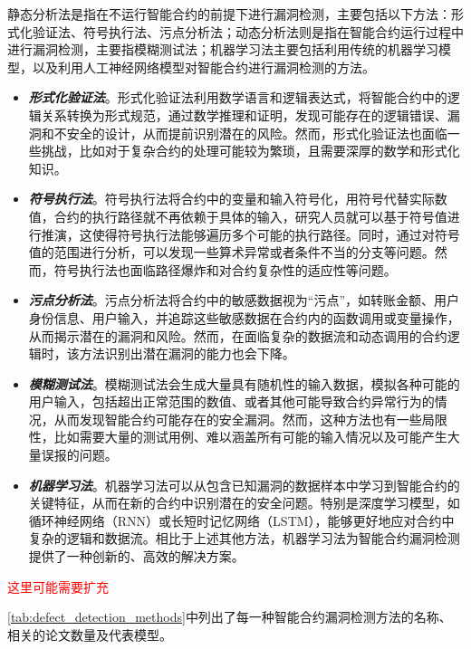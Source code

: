静态分析法是指在不运行智能合约的前提下进行漏洞检测，主要包括以下方法：形式化验证法、符号执行法、污点分析法；动态分析法则是指在智能合约运行过程中进行漏洞检测，主要指模糊测试法；机器学习法主要包括利用传统的机器学习模型，以及利用人工神经网络模型对智能合约进行漏洞检测的方法。
\begin{itemize}
    \item \textit{\textbf{形式化验证法}}。形式化验证法利用数学语言和逻辑表达式，将智能合约中的逻辑关系转换为形式规范，通过数学推理和证明，发现可能存在的逻辑错误、漏洞和不安全的设计，从而提前识别潜在的风险。然而，形式化验证法也面临一些挑战，比如对于复杂合约的处理可能较为繁琐，且需要深厚的数学和形式化知识。
    \item \textit{\textbf{符号执行法}}。符号执行法将合约中的变量和输入符号化，用符号代替实际数值，合约的执行路径就不再依赖于具体的输入，研究人员就可以基于符号值进行推演，这使得符号执行法能够遍历多个可能的执行路径。同时，通过对符号值的范围进行分析，可以发现一些算术异常或者条件不当的分支等问题。然而，符号执行法也面临路径爆炸和对合约复杂性的适应性等问题。
    \item \textit{\textbf{污点分析法}}。污点分析法将合约中的敏感数据视为“污点”，如转账金额、用户身份信息、用户输入，并追踪这些敏感数据在合约内的函数调用或变量操作，从而揭示潜在的漏洞和风险。然而，在面临复杂的数据流和动态调用的合约逻辑时，该方法识别出潜在漏洞的能力也会下降。
    \item \textit{\textbf{模糊测试法}}。模糊测试法会生成大量具有随机性的输入数据，模拟各种可能的用户输入，包括超出正常范围的数值、或者其他可能导致合约异常行为的情况，从而发现智能合约可能存在的安全漏洞。然而，这种方法也有一些局限性，比如需要大量的测试用例、难以涵盖所有可能的输入情况以及可能产生大量误报的问题。
    \item \textit{\textbf{机器学习法}}。机器学习法可以从包含已知漏洞的数据样本中学习到智能合约的关键特征，从而在新的合约中识别潜在的安全问题。特别是深度学习模型，如循环神经网络（RNN）或长短时记忆网络（LSTM），能够更好地应对合约中复杂的逻辑和数据流。相比于上述其他方法，机器学习法为智能合约漏洞检测提供了一种创新的、高效的解决方案。
\end{itemize}

\textcolor{red}{这里可能需要扩充}

\par \autoref{tab:defect_detection_methods}中列出了每一种智能合约漏洞检测方法的名称、相关的论文数量及代表模型。

